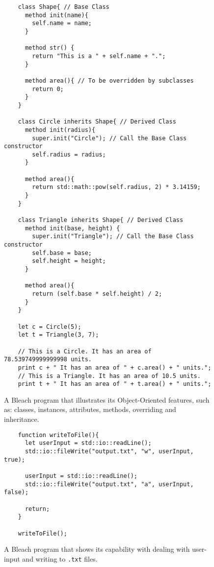 \begin{figure}
    \centering
    \begin{lstlisting}
    class Shape{ // Base Class
      method init(name){
        self.name = name;
      }
    
      method str() {
        return "This is a " + self.name + ".";
      }
    
      method area(){ // To be overridden by subclasses
        return 0;
      }
    }
    
    class Circle inherits Shape{ // Derived Class
      method init(radius){
        super.init("Circle"); // Call the Base Class constructor
        self.radius = radius;
      }
    
      method area(){
        return std::math::pow(self.radius, 2) * 3.14159;
      }
    }
    
    class Triangle inherits Shape{ // Derived Class
      method init(base, height) {
        super.init("Triangle"); // Call the Base Class constructor
        self.base = base;
        self.height = height;
      }
    
      method area(){
        return (self.base * self.height) / 2;
      }
    }
    
    let c = Circle(5);
    let t = Triangle(3, 7);
    
    // This is a Circle. It has an area of 78.539749999999998 units.
    print c + " It has an area of " + c.area() + " units.";
    // This is a Triangle. It has an area of 10.5 units.
    print t + " It has an area of " + t.area() + " units.";
    \end{lstlisting}
    \caption{A Bleach program that illustrates its Object-Oriented features, such as: classes, instances, attributes, methods, overriding and inheritance.}
\end{figure}

\begin{figure}
    \centering
    \begin{lstlisting}
    function writeToFile(){
      let userInput = std::io::readLine();
      std::io::fileWrite("output.txt", "w", userInput, true);
    
      userInput = std::io::readLine();
      std::io::fileWrite("output.txt", "a", userInput, false);
    
      return;
    }
    
    writeToFile();
    \end{lstlisting}
    \caption{A Bleach program that shows its capability with dealing with user-input and writing to \texttt{.txt} files.}
\end{figure}

